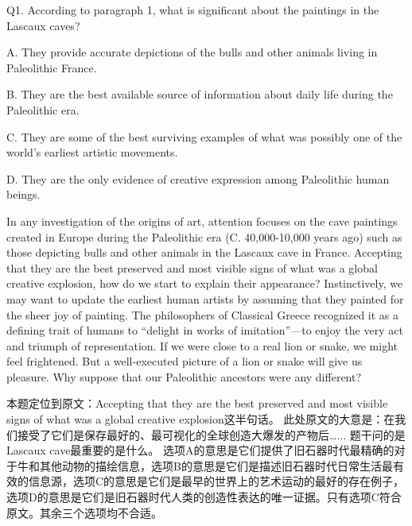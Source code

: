 \begin{blk}
    \begin{qst}
        Q1.
        According to paragraph 1, what is significant about the paintings in the Lascaux caves?
    \end{qst}

    \begin{chc}
        A.
        They provide accurate depictions of the bulls and other animals living in Paleolithic France.

        B.
        They are the best available source of information about daily life during the Paleolithic era.

        C.
        They are some of the best surviving examples of what was possibly one of the world’s earliest artistic movements.

        D.
        They are the only evidence of creative expression among Paleolithic human beings.
    \end{chc}

    \begin{psgq}
        In any investigation of the origins of art, attention focuses on the cave paintings created in Europe during the Paleolithic era (C. 40,000-10,000 years ago) such as those depicting bulls and other animals in the Lascaux cave in France. Accepting that they are the best preserved and most visible signs of what was a global creative explosion, how do we start to explain their appearance? Instinctively, we may want to update the earliest human artists by assuming that they painted for the sheer joy of painting. The philosophers of Classical Greece recognized it as a defining trait of humans to “delight in works of imitation”—to enjoy the very act and triumph of representation. If we were close to a real lion or snake, we might feel frightened. But a well-executed picture of a lion or snake will give us pleasure. Why suppose that our Paleolithic ancestors were any different?
    \end{psgq}

    \begin{nlz}
        本题定位到原文：Accepting that they are the best preserved and most visible signs of what was a global creative explosion这半句话。 此处原文的大意是：在我们接受了它们是保存最好的、最可视化的全球创造大爆发的产物后…... 题干问的是Lascaux cave最重要的是什么。 选项A的意思是它们提供了旧石器时代最精确的对于牛和其他动物的描绘信息，选项B的意思是它们是描述旧石器时代日常生活最有效的信息源，选项C的意思是它们是最早的世界上的艺术运动的最好的存在例子，选项D的意思是它们是旧石器时代人类的创造性表达的唯一证据。只有选项C符合原文。其余三个选项均不合适。
    \end{nlz}
\end{blk}

